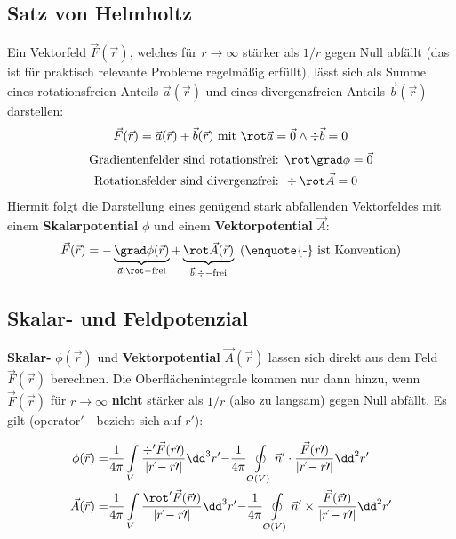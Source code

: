   \subsection{Satz von Helmholtz}\label{helmholtz}
	  Ein Vektorfeld $\vec{F}(\vec{r})$, welches für $r\to\infty$ stärker als $1/r$ gegen
	  Null abfällt (das ist für praktisch relevante Probleme regelmäßig erfüllt),
	  lässt sich als Summe eines rotationsfreien Anteils $\vec{a}(\vec{r})$ und
	  eines divergenzfreien Anteils $\vec{b}(\vec{r})$ darstellen:
	  \begin{equation}
		  \begin{split}
			  \vec{F}(\vec{r}) = \vec{a}(\vec{r}) + \vec{b}(\vec{r}) \text{ mit } \rot\vec{a}=
			  \vec{0}\land \div \vec{b}= 0
		  \end{split}
	  \end{equation}
	  \begin{equation}
		  \begin{split}
			  \text{Gradientenfelder sind rotationsfrei: }&\rot\grad \phi =\vec{0}\\ \text{Rotationsfelder
				  sind divergenzfrei: }&\div\rot \vec{A}= 0
		  \end{split}
	  \end{equation}
	  Hiermit folgt die Darstellung eines genügend stark abfallenden Vektorfeldes mit einem \textbf{Skalarpotential} $\phi$ und
	  einem \textbf{Vektorpotential} $\vec{A}$:
	  \begin{equation}
		  \begin{split}
			  \vec{F}(\vec{r}) = - \underbrace{\grad \phi (\vec{r})}_{\vec{a}:\rot-\text{frei}} + \underbrace{\rot\vec{A}(\vec{r})}_{\vec{b}:\div-\text{frei}} \text{ (\enquote{-}
				  ist Konvention)}
		  \end{split}
	  \end{equation}
  \subsection{Skalar- und Feldpotenzial}
	  \textbf{Skalar-} $\phi (\vec{r})$ und \textbf{Vektorpotential}
	  $\vec{A}(\vec{r})$ lassen sich direkt aus dem Feld $\vec{F}(\vec{r})$
	  berechnen. Die Oberflächenintegrale kommen nur dann hinzu, wenn $\vec{F}(\vec{r})$ für $r\to\infty$ \textbf{nicht} stärker als $1/r$ (also zu langsam) gegen Null abfällt. Es gilt (operator$'$ - bezieht sich auf $r\prime$):

	  \begin{equation}
		  \begin{split}
			  \phi (\vec{r}) =&\frac{1}{4\pi}\int\limits_{V} \frac{\div' \vec{F}(\vec{r}\prime)}{\left|\vec{r}-\vec{r}\prime\right|}
			  \dd^{3}r'{- \frac{1}{4\pi} \oint\limits_{O(V)} \vec{n}' \cdot \frac{\vec{F}(\vec{r}\prime)}{\left|\vec{r}-\vec{r}\prime\right|} \dd^2r'}
			  \\ \vec{A}(\vec{r}) =&\frac{1}{4\pi}\int\limits_{V} \frac{\rot' \vec{F}(\vec{r}\prime)}{\left|\vec{r}-\vec{r}\prime\right|}
			  \dd^{3}r'{- \frac{1}{4\pi} \oint\limits_{O(V)} \vec{n}' \times \frac{\vec{F}(\vec{r}\prime)}{\left|\vec{r}-\vec{r}\prime\right|} \dd^2r'}
		  \end{split}
	  \end{equation}
